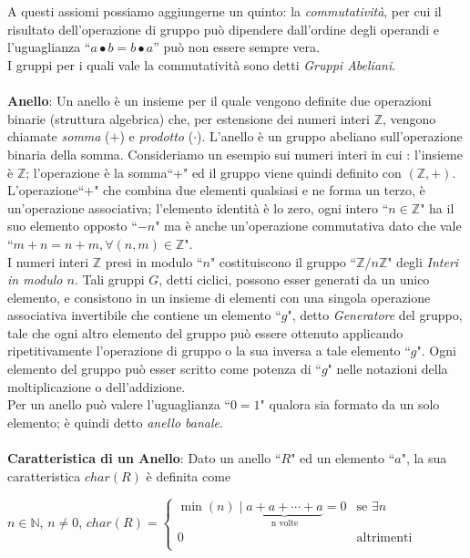 \documentclass[a4paper,12pt]{tesiinfo}
\begin{document}
%
%
%
\\\\
A questi assiomi possiamo aggiungerne un quinto: la \textit{commutativit\`a}, per cui il risultato dell'operazione di gruppo pu\`o dipendere dall'ordine degli operandi e l'uguaglianza ``$ a \bullet b = b \bullet a$'' pu\`o non essere sempre vera. 
\\
I gruppi per i quali vale la commutativit\`a sono detti \textit{Gruppi Abeliani}.
\\\\
%
%
%
\textbf{Anello}: Un anello \`e un insieme per il quale vengono definite due operazioni binarie (struttura algebrica) che, per estensione dei numeri interi $\mathbb{Z}$, vengono chiamate \textit{somma} ($+$) e \textit{prodotto} ($\cdot$). L'anello \`e un gruppo abeliano sull'operazione binaria della somma. Consideriamo un esempio sui numeri interi in cui : l'insieme \`e $\mathbb{Z}$;
l'operazione \`e la somma``+" 
ed il gruppo viene quindi definito con $(\mathbb{Z}, +)$. 
L'operazione``+" che  combina due elementi qualsiasi e ne forma un terzo, \`e un'operazione associativa; l'elemento identit\`a \`e lo zero, ogni intero ``$n \in \mathbb{Z}$" ha il suo elemento opposto ``$-n$" ma \`e anche un'operazione commutativa dato che vale ``$m + n = n + m, \forall (n, m) \in \mathbb{Z}$".
\\
I numeri interi $\mathbb{Z}$ presi in modulo ``$n$" costituiscono il gruppo ``$\mathbb{Z}/ n \mathbb{Z}$" degli \textit{Interi in modulo $n$}. Tali gruppi $G$, detti ciclici, possono esser generati da un unico elemento, e consistono in un insieme di elementi con una singola operazione associativa invertibile che contiene un elemento ``$g$", detto \textit{Generatore} del gruppo, tale che ogni altro elemento del gruppo pu\`o essere ottenuto applicando ripetitivamente l'operazione di gruppo o la sua inversa a tale elemento ``$g$". Ogni elemento del gruppo pu\`o esser scritto come potenza di ``$g$" nelle notazioni della moltiplicazione o dell'addizione.
\\
Per un anello pu\`o valere l'uguaglianza ``$0 = 1$" qualora sia formato da un solo elemento;  \`e quindi detto \textit{anello banale}.
\\\\
%
%
%
\textbf{Caratteristica di un Anello}: Dato un anello ``$R$" ed un elemento ``$a$",  la sua caratteristica $char(R)$ \`e definita come \begin{center} $n  \in \mathbb{N}$, $n \ne 0 $, $char(R) = \begin{cases} \min (n) \mid \underbrace{a+a+\cdots+a}_\text{n volte} = 0 & \mbox{se }\exists n\\
0 & \mbox{altrimenti}\\
\end{cases}$
\end{center}
\end{document}
